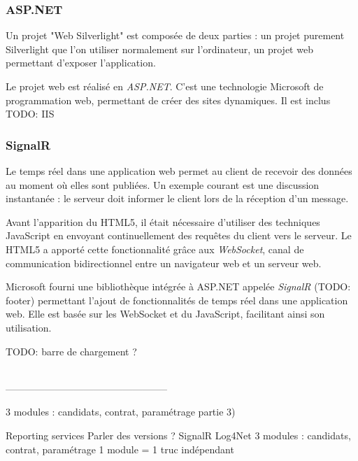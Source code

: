 \subsubsection{ASP.NET}

Un projet "Web Silverlight" est composée de deux parties : un projet purement Silverlight que l'on utiliser normalement sur l'ordinateur, un projet web permettant d'exposer l'application.

Le projet web est réalisé en \textit{ASP.NET}. C'est une technologie Microsoft de programmation web, permettant de créer des sites dynamiques. Il est inclus
TODO: IIS

\subsubsection{SignalR}

Le temps réel dans une application web permet au client de recevoir des données au moment où elles sont publiées. Un exemple courant est une discussion instantanée : le serveur doit informer le client lors de la réception d'un message.

Avant l'apparition du HTML5, il était nécessaire d'utiliser des techniques JavaScript en envoyant continuellement des requêtes du client vers le serveur. Le HTML5 a apporté cette fonctionnalité grâce aux \textit{WebSocket}, canal de communication bidirectionnel entre un navigateur web et un serveur web.

Microsoft fourni une bibliothèque intégrée à ASP.NET appelée \textit{SignalR} (TODO: footer) permettant l'ajout de fonctionnalités de temps réel dans une application web. Elle est basée sur les WebSocket et du JavaScript, facilitant ainsi son utilisation.

TODO: barre de chargement ?

~~\\--------------------------------------------------

3 modules : candidats, contrat, paramétrage partie 3)

Reporting services
Parler des versions ?
SignalR
Log4Net
3 modules : candidats, contrat, paramétrage
1 module = 1 truc indépendant

